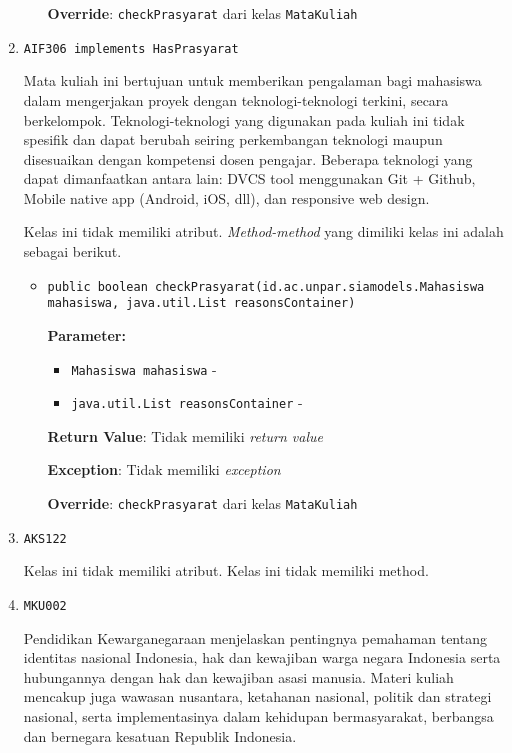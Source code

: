 \documentclass{article}
\begin{document}
\begin{enumerate}
\begin{itemize}
\textbf{Override}: \texttt{checkPrasyarat} dari kelas \texttt{MataKuliah}

\end{itemize}
\item \texttt{AIF306 implements HasPrasyarat}

Mata kuliah ini bertujuan untuk memberikan pengalaman bagi mahasiswa dalam
 mengerjakan proyek dengan teknologi-teknologi terkini, secara berkelompok.
 Teknologi-teknologi yang digunakan pada kuliah ini tidak spesifik dan dapat
 berubah seiring perkembangan teknologi maupun disesuaikan dengan kompetensi
 dosen pengajar. Beberapa teknologi yang dapat dimanfaatkan antara lain: DVCS
 tool menggunakan Git + Github, Mobile native app (Android, iOS, dll), dan
 responsive web design.

Kelas ini tidak memiliki atribut. \textit{Method-method} yang dimiliki kelas ini adalah sebagai berikut.
\begin{itemize}
\item \texttt{public boolean checkPrasyarat(id.ac.unpar.siamodels.Mahasiswa mahasiswa, java.util.List reasonsContainer)}



\textbf{Parameter:}
\begin{itemize}
\item \texttt{Mahasiswa mahasiswa} - 
\item \texttt{java.util.List reasonsContainer} - 
\end{itemize}
\textbf{Return Value}: Tidak memiliki \textit{return value}

\textbf{Exception}: Tidak memiliki \textit{exception}

\textbf{Override}: \texttt{checkPrasyarat} dari kelas \texttt{MataKuliah}

\end{itemize}
\item \texttt{AKS122}



Kelas ini tidak memiliki atribut. Kelas ini tidak memiliki method. \item \texttt{MKU002}

Pendidikan Kewarganegaraan menjelaskan pentingnya pemahaman tentang identitas nasional 
 Indonesia, hak dan kewajiban warga negara Indonesia serta hubungannya dengan hak dan 
 kewajiban asasi manusia. Materi kuliah mencakup juga wawasan nusantara, ketahanan nasional, 
 politik dan strategi nasional, serta implementasinya dalam kehidupan bermasyarakat, berbangsa 
 dan bernegara kesatuan Republik Indonesia.


\end{enumerate}
\end{document}
